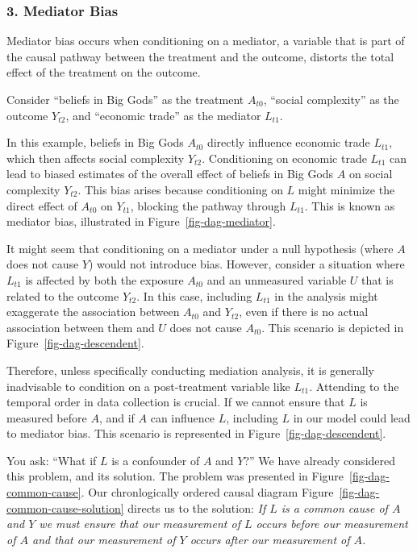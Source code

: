 \documentclass[
  singlecolumn,
  9pt]{article}
\begin{document}
\subsubsection{3. Mediator Bias}\label{mediator-bias}

Mediator bias occurs when conditioning on a mediator, a variable that is
part of the causal pathway between the treatment and the outcome,
distorts the total effect of the treatment on the outcome.

Consider ``beliefs in Big Gods'' as the treatment \(A_{t0}\), ``social
complexity'' as the outcome \(Y_{t2}\), and ``economic trade'' as the
mediator \(L_{t1}\).

In this example, beliefs in Big Gods \(A_{t0}\) directly influence
economic trade \(L_{t1}\), which then affects social complexity
\(Y_{t2}\). Conditioning on economic trade \(L_{t1}\) can lead to biased
estimates of the overall effect of beliefs in Big Gods \(A\) on social
complexity \(Y_{t2}\). This bias arises because conditioning on \(L\)
might minimize the direct effect of \(A_{t0}\) on \(Y_{t1}\), blocking
the pathway through \(L_{t1}\). This is known as mediator bias,
illustrated in Figure~\ref{fig-dag-mediator}.

It might seem that conditioning on a mediator under a null hypothesis
(where \(A\) does not cause \(Y\)) would not introduce bias. However,
consider a situation where \(L_{t1}\) is affected by both the exposure
\(A_{t0}\) and an unmeasured variable \(U\) that is related to the
outcome \(Y_{t2}\). In this case, including \(L_{t1}\) in the analysis
might exaggerate the association between \(A_{t0}\) and \(Y_{t2}\), even
if there is no actual association between them and \(U\) does not cause
\(A_{t0}\). This scenario is depicted in
Figure~\ref{fig-dag-descendent}.

Therefore, unless specifically conducting mediation analysis, it is
generally inadvisable to condition on a post-treatment variable like
\(L_{t1}\). Attending to the temporal order in data collection is
crucial. If we cannot ensure that \(L\) is measured before \(A\), and if
\(A\) can influence \(L\), including \(L\) in our model could lead to
mediator bias. This scenario is represented in
Figure~\ref{fig-dag-descendent}.

You ask: ``What if \(L\) is a confounder of \(A\) and \(Y\)?'' We have
already considered this problem, and its solution. The problem was
presented in Figure~\ref{fig-dag-common-cause}. Our chronlogically
ordered causal diagram Figure~\ref{fig-dag-common-cause-solution}
directs us to the solution: \emph{If \(L\) is a common cause of \(A\)
and \(Y\) we must ensure that our measurement of \(L\) occurs before our
measurement of \(A\) and that our measurement of \(Y\) occurs after our
measurement of \(A\).}
\end{document}
